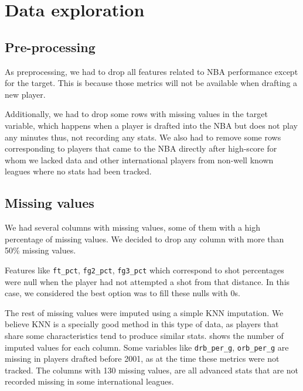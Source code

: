 
\section{Data exploration}%
\label{sec:data-exploration}

\subsection{Pre-processing}%
\label{sub:pre-processing}

As preprocessing, we had to drop all features related to NBA performance except for the target. This is because those metrics will not be available when drafting a new player. 

Additionally, we had to drop some rows with missing values in the target variable, which happens when a player is drafted into the NBA but does not play any minutes thus, not recording any stats. We also had to remove some rows corresponding to players that came to the NBA directly after high-score for whom we lacked data and other international players from non-well known leagues where no stats had been tracked.

\subsection{Missing values}%
\label{sub:missing-values}

We had several columns with missing values, some of them with a high percentage of missing values. We decided to drop any column with more than 50\% missing values.

Features like \texttt{ft\_pct}, \texttt{fg2\_pct}, \texttt{fg3\_pct} which correspond to shot percentages were null when the player had not attempted a shot from that distance. In this case, we considered the best option was to fill these nulls with 0s.

The rest of missing values were imputed using a simple KNN imputation. We believe KNN is a specially good method in this type of data, as players that share some characteristics tend to produce similar stats.  shows the number of imputed
values for each column. Some variables like \texttt{drb\_per\_g}, \texttt{orb\_per\_g} are missing in players drafted before 2001, as at the time these metrics were not tracked. The columns with 130 missing values, are all advanced stats that are not recorded missing in some international leagues.

